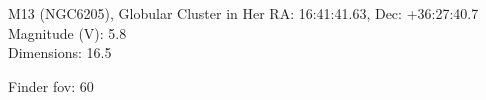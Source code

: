 \begin{block}{M13 (NGC6205), Globular Cluster in Her}
    RA: 16:41:41.63, Dec: +36:27:40.7 \\ 
    Magnitude (V): 5.8 \\ 
    Dimensions: 16.5 

    Finder fov: 60 
\end{block}